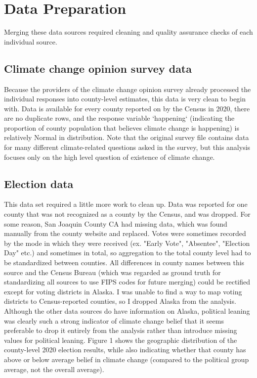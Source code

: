 \documentclass{article}
\begin{document}
\section{Data Preparation}

Merging these data sources required cleaning and quality
assurance checks of each individual source.

\subsection{Climate change opinion survey data}
Because the providers of the climate change opinion survey already processed
the individual responses into county-level estimates, this data is very clean
to begin with. Data is available for every county reported on by the Census
in 2020, there are no duplicate rows, and the response variable `happening`
(indicating the proportion of county population that believes climate change
is happening) is relatively Normal in distribution. Note that the original
survey file contains data for many different climate-related questions asked
in the survey, but this analysis focuses only on the high level
question of existence of climate change.

\subsection{Election data}
This data set required a little more work to clean up. Data was reported for
one county that was not recognized as a county by the Census, and was dropped. For
some reason, San Joaquin County CA had missing data, which was found 
manually from the county website and replaced. Votes were sometimes
recorded by the mode in which they were received (ex. "Early Vote", 
"Absentee", "Election Day" etc.) and sometimes in total, so aggregation to 
the total county level had to be standardized between counties. All differences in county names between this source and the 
Census Bureau (which was regarded as ground truth for standardizing all sources
to use FIPS codes for future merging) could be rectified except for voting districts in Alaska.
I was unable to find a way to map voting districts to Census-reported
counties, so I dropped Alaska from the analysis. Although the other data
sources do have information on Alaska, political leaning was clearly such a
strong indicator of climate change belief that it seems preferable to
drop it entirely from the analysis rather than introduce missing values for
political leaning.
Figure 1 shows the geographic distribution of the county-level 2020 election
results, while also indicating whether that county has above or below average
belief in climate change (compared to the political group average, not the
overall average).
\end{document}
